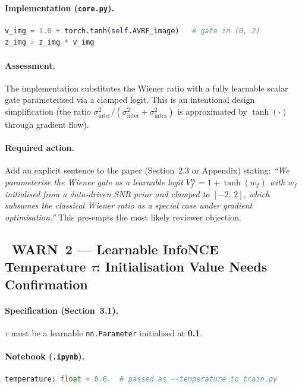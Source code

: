 \documentclass[12pt,a4paper]{article}
\newcommand{\WARN}{\textcolor{warnambr}{\ding{115}~\textbf{WARN}}}
\begin{document}
\paragraph{Implementation (\texttt{core.py}).}
\begin{lstlisting}[language=Python]
v_img = 1.0 + torch.tanh(self.AVRF_image)   # gate in (0, 2)
z_img = z_img * v_img
\end{lstlisting}

\paragraph{Assessment.}
The implementation substitutes the Wiener ratio with a fully learnable scalar
gate parameterised via a clamped logit.  This is an intentional design
simplification (the ratio $\sigma^2_{\mathrm{inter}}/(\sigma^2_{\mathrm{inter}}
+ \sigma^2_{\mathrm{intra}})$ is approximated by $\tanh(\cdot)$ through
gradient flow).

\paragraph{Required action.}
Add an explicit sentence to the paper (Section~2.3 or Appendix) stating:
\emph{``We parameterise the Wiener gate as a learnable logit
$V^m_f = 1 + \tanh(w_f)$ with $w_f$ initialised from a data-driven SNR prior
and clamped to $[-2,\,2]$, which subsumes the classical Wiener ratio as a
special case under gradient optimisation.''}
This pre-empts the most likely reviewer objection.

\subsection[\WARN{} 2 — Learnable \(\tau\) Initialisation]
           {\WARN~2 --- Learnable InfoNCE Temperature \(\tau\): Initialisation Value Needs Confirmation}

\paragraph{Specification (Section~3.1).}
$\tau$ must be a learnable \texttt{nn.Parameter} initialised at \textbf{0.1}.

\paragraph{Notebook (\texttt{.ipynb}).}
\begin{lstlisting}[language=Python]
temperature: float = 0.6   # passed as --temperature to train.py
\end{lstlisting}
\end{document}
